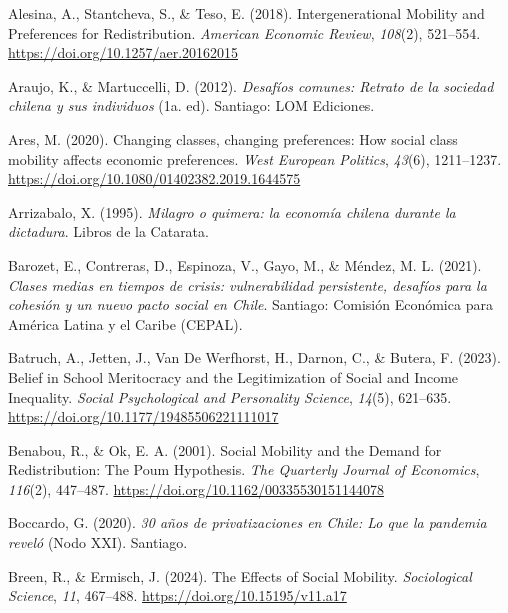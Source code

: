 \documentclass[
  13pt,
]{article}
\newlength{\cslhangindent}
\newenvironment{CSLReferences}[2] %
 {\begin{list}{}{%
  \setlength{\itemindent}{0pt}
  \setlength{\leftmargin}{0pt}
  \setlength{\parsep}{0pt}
  \ifodd #1
   \setlength{\leftmargin}{\cslhangindent}
   \setlength{\itemindent}{-1\cslhangindent}
  \fi
  \setlength{\itemsep}{#2\baselineskip}}}
 {\end{list}}
\begin{document}
\label{refs}
\begin{CSLReferences}{1}{0}
Alesina, A., Stantcheva, S., \& Teso, E. (2018). Intergenerational
{Mobility} and {Preferences} for {Redistribution}. \emph{American
Economic Review}, \emph{108}(2), 521--554.
\url{https://doi.org/10.1257/aer.20162015}

Araujo, K., \& Martuccelli, D. (2012). \emph{Desaf{í}os comunes: Retrato
de la sociedad chilena y sus individuos} (1a. ed). Santiago: LOM
Ediciones.

Ares, M. (2020). Changing classes, changing preferences: How social
class mobility affects economic preferences. \emph{West European
Politics}, \emph{43}(6), 1211--1237.
\url{https://doi.org/10.1080/01402382.2019.1644575}

Arrizabalo, X. (1995). \emph{{Milagro o quimera: la econom{í}a chilena
durante la dictadura}}. Libros de la Catarata.

Barozet, E., Contreras, D., Espinoza, V., Gayo, M., \& Méndez, M. L.
(2021). \emph{{Clases medias en tiempos de crisis: vulnerabilidad
persistente, desaf{í}os para la cohesi{ó}n y un nuevo pacto social en
Chile}}. Santiago: Comisi{ó}n Econ{ó}mica para Am{é}rica Latina y el
Caribe (CEPAL).

Batruch, A., Jetten, J., Van De Werfhorst, H., Darnon, C., \& Butera, F.
(2023). Belief in {School Meritocracy} and the {Legitimization} of
{Social} and {Income Inequality}. \emph{Social Psychological and
Personality Science}, \emph{14}(5), 621--635.
\url{https://doi.org/10.1177/19485506221111017}

Benabou, R., \& Ok, E. A. (2001). Social {Mobility} and the {Demand} for
{Redistribution}: {The Poum Hypothesis}. \emph{The Quarterly Journal of
Economics}, \emph{116}(2), 447--487.
\url{https://doi.org/10.1162/00335530151144078}

Boccardo, G. (2020). \emph{30 a{ñ}os de privatizaciones en {Chile}: Lo
que la pandemia revel{ó}} (Nodo XXI). Santiago.

Breen, R., \& Ermisch, J. (2024). The {Effects} of {Social Mobility}.
\emph{Sociological Science}, \emph{11}, 467--488.
\url{https://doi.org/10.15195/v11.a17}


\end{CSLReferences}
\end{document}
